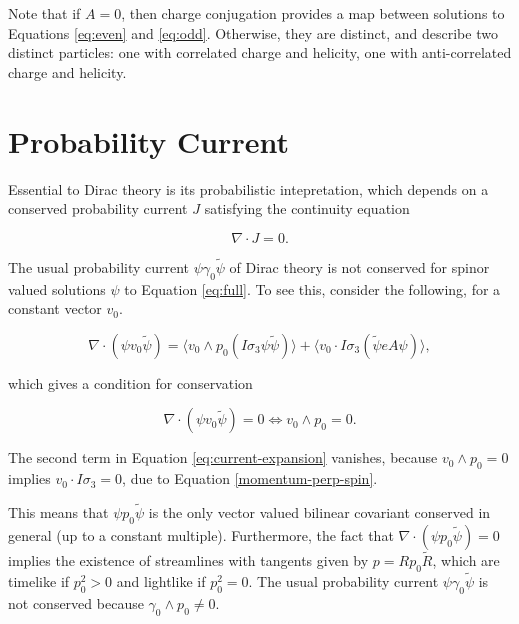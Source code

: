 \documentclass{article}
\begin{document}
  Note that if $A = 0$, then charge conjugation provides a map between solutions to Equations \ref{eq:even} and \ref{eq:odd}. Otherwise, they are distinct, and describe two distinct particles: one with correlated charge and helicity, one with anti-correlated charge and helicity.

  \section{Probability Current}\label{probability}

  Essential to Dirac theory is its probabilistic intepretation, which depends on a conserved probability current $J$ satisfying the continuity equation

  \begin{equation}
    \nabla \cdot J = 0.
  \end{equation}

  The usual probability current $\psi \gamma_0 \widetilde \psi$ of Dirac theory is not conserved for spinor valued solutions $\psi$ to Equation \ref{eq:full}. To see this, consider the following, for a constant vector $v_0$.

  \begin{equation}
    \nabla \cdot (\psi v_0 \widetilde \psi) = \langle v_0 \wedge p_0 (I \sigma_3 \psi \widetilde \psi) \rangle + \langle v_0 \cdot I \sigma_3 (\widetilde \psi e A \psi) \rangle,\label{eq:current-expansion}
  \end{equation}

  which gives a condition for conservation

  \begin{equation}
    \nabla \cdot (\psi v_0 \widetilde \psi) = 0 \iff v_0 \wedge p_0 = 0.
  \end{equation}

  The second term in Equation \ref{eq:current-expansion} vanishes, because $v_0 \wedge p_0 = 0$ implies $v_0 \cdot I \sigma_3 = 0$, due to Equation \ref{momentum-perp-spin}.

  This means that $\psi p_0 \widetilde \psi$ is the only vector valued bilinear covariant conserved in general (up to a constant multiple). Furthermore, the fact that $\nabla \cdot (\psi p_0 \widetilde \psi) = 0$ implies the existence of streamlines with tangents given by $p = R p_0 \widetilde R$, which are timelike if $p_0^2 > 0$ and lightlike if $p_0^2 = 0$.\cite{hestenes} The usual probability current $\psi \gamma_0 \widetilde \psi$ is not conserved because $\gamma_0 \wedge p_0 \not= 0$.
\end{document}
